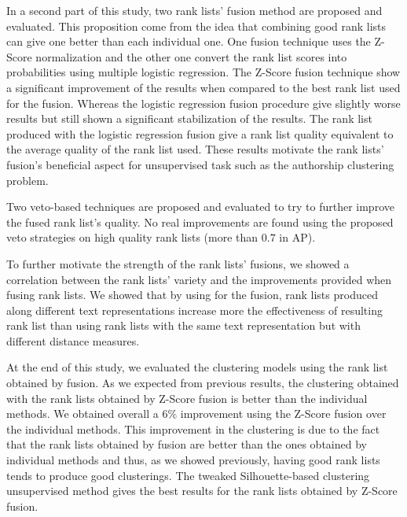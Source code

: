 In a second part of this study, two rank lists' fusion method are proposed and evaluated.
This proposition come from the idea that combining good rank lists can give one better than each individual one.
One fusion technique uses the Z-Score normalization and the other one convert the rank list scores into probabilities using multiple logistic regression.
The Z-Score fusion technique show a significant improvement of the results when compared to the best rank list used for the fusion.
Whereas the logistic regression fusion procedure give slightly worse results but still shown a significant stabilization of the results.
The rank list produced with the logistic regression fusion give a rank list quality equivalent to the average quality of the rank list used.
These results motivate the rank lists' fusion's beneficial aspect for unsupervised task such as the authorship clustering problem.

Two veto-based techniques are proposed and evaluated to try to further improve the fused rank list's quality.
No real improvements are found using the proposed veto strategies on high quality rank lists (more than $0.7$ in AP).

To further motivate the strength of the rank lists' fusions, we showed a correlation between the rank lists' variety and the improvements provided when fusing rank lists.
We showed that by using for the fusion, rank lists produced along different text representations increase more the effectiveness of resulting rank list than using rank lists with the same text representation but with different distance measures.

At the end of this study, we evaluated the clustering models using the rank list obtained by fusion.
As we expected from previous results, the clustering obtained with the rank lists obtained by Z-Score fusion is better than the individual methods.
We obtained overall a $6\%$ improvement using the Z-Score fusion over the individual methods.
This improvement in the clustering is due to the fact that the rank lists obtained by fusion are better than the ones obtained by individual methods and thus, as we showed previously, having good rank lists tends to produce good clusterings.
The tweaked Silhouette-based clustering unsupervised method gives the best results for the rank lists obtained by Z-Score fusion.


